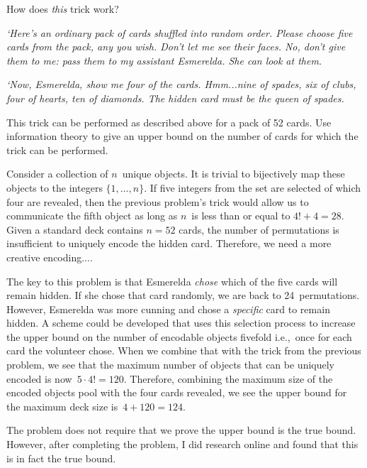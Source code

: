 \begin{problem}{15}{6}
  How does \textit{this} trick work?

  \begin{addmargin}[0.1in]{0.1in}
    \textnormal{\textit{`Here's an ordinary pack of cards shuffled into random order.  Please choose five cards from the pack, any you wish. Don't let me see their faces. No, don't give them to me: pass them to my assistant Esmerelda.  She can look at them.}}

    \textnormal{\textit{`Now, Esmerelda, show me four of the cards.  Hmm...nine of spades, six of clubs, four of hearts, ten of diamonds. The hidden card must be the queen of spades.}}
  \end{addmargin}

  This trick can be performed as described above for a pack of 52 cards.  Use information theory to give an upper bound on the number of cards for which the trick can be performed.
\end{problem}

Consider a collection of $n$~unique objects.  It is trivial to bijectively map these objects to the integers $\{1,\ldots,n\}$. If five integers from the set are selected of which four are revealed, then the previous problem's trick would allow us to communicate the fifth object as long as $n$~is less than or equal to ${4! + 4 = 28}$.  Given a standard deck contains $n=52$ cards, the number of permutations is insufficient to uniquely encode the hidden card.  Therefore, we need a more creative encoding....

The key to this problem is that Esmerelda \textit{chose} which of the five cards will remain hidden.  If she chose that card randomly, we are back to 24~permutations.  However, Esmerelda was more cunning and chose a \textit{specific} card to remain hidden.  A scheme could be developed that uses this selection process to increase the upper bound on the number of encodable objects fivefold i.e.,~once for each card the volunteer chose.  When we combine that with the trick from the previous problem, we see that the maximum number of objects that can be uniquely encoded is now~${5\cdot4!=120}$.  Therefore, combining the maximum size of the encoded objects pool with the four cards revealed, we see the upper bound for the maximum deck size is~${4 + 120 = \boxed{124}}$.

The problem does not require that we prove the upper bound is the true bound.  However, after completing the problem, I did research online and found that this is in fact the true bound.
